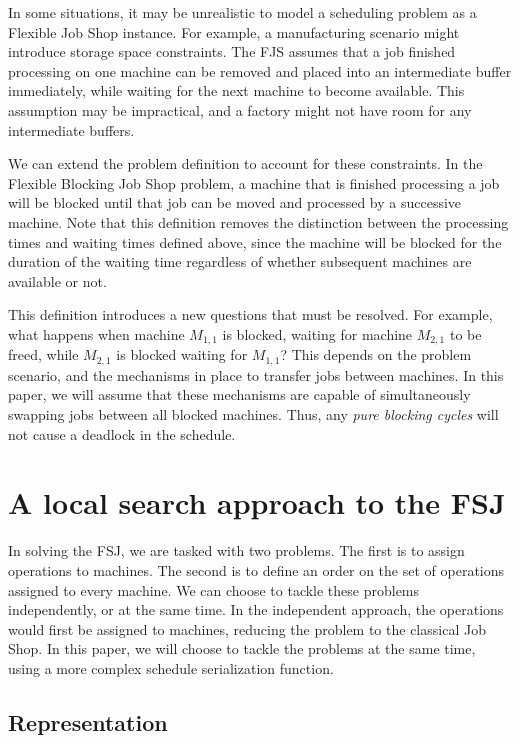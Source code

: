\documentclass[a4paper,10pt]{article}
\begin{document}
In some situations, it may be unrealistic to model a scheduling problem as a Flexible Job Shop instance. For example, a manufacturing scenario might introduce storage space constraints. The FJS assumes that a job finished processing on one machine can be removed and placed into an intermediate buffer immediately, while waiting for the next machine to become available. This assumption may be impractical, and a factory might not have room for any intermediate buffers.

We can extend the problem definition to account for these constraints. In the Flexible Blocking Job Shop problem, a machine that is finished processing a job will be blocked until that job can be moved and processed by a successive machine. Note that this definition removes the distinction between the processing times and waiting times defined above, since the machine will be blocked for the duration of the waiting time regardless of whether subsequent machines are available or not.

This definition introduces a new questions that must be resolved. For example, what happens when machine $M_{1,1}$ is blocked, waiting for machine $M_{2,1}$ to be freed, while $M_{2,1}$ is blocked waiting for $M_{1,1}$? This depends on the problem scenario, and the mechanisms in place to transfer jobs between machines. In this paper, we will assume that these mechanisms are capable of simultaneously swapping jobs between all blocked machines. Thus, any \emph{pure blocking cycles} will not cause a deadlock in the schedule.

\section{A local search approach to the FSJ}

In solving the FSJ, we are tasked with two problems. The first is to assign operations to machines. The second is to define an order on the set of operations assigned to every machine. We can choose to tackle these problems independently, or at the same time. In the independent approach, the operations would first be assigned to machines, reducing the problem to the classical Job Shop. In this paper, we will choose to tackle the problems at the same time, using a more complex schedule serialization function.

\subsection{Representation}
\end{document}
